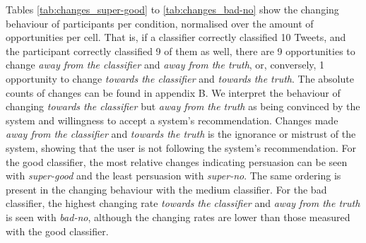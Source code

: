 \noindent Tables \ref{tab:changes_super-good} to \ref{tab:changes_bad-no} show the changing behaviour of participants per condition, normalised over the amount of opportunities per cell. That is, if a classifier correctly classified 10 Tweets, and the participant correctly classified 9 of them as well, there are 9 opportunities to change \textit{away from the classifier} and \textit{away from the truth}, or, conversely, 1 opportunity to change \textit{towards the classifier} and \textit{towards the truth}. The absolute counts of changes can be found in appendix B.\newline
We interpret the behaviour of changing \textit{towards the classifier} but \textit{away from the truth} as being convinced by the system and willingness to accept a system's recommendation. Changes made \textit{away from the classifier} and \textit{towards the truth} is the ignorance or mistrust of the system, showing that the user is not following the system's recommendation. For the good classifier, the most relative changes indicating persuasion can be seen with \textit{super-good} and the least persuasion with \textit{super-no}. The same ordering is present in the changing behaviour with the medium classifier. For the bad classifier, the highest changing rate \textit{towards the classifier} and \textit{away from the truth} is seen with \textit{bad-no}, although the changing rates are lower than those measured with the good classifier.

